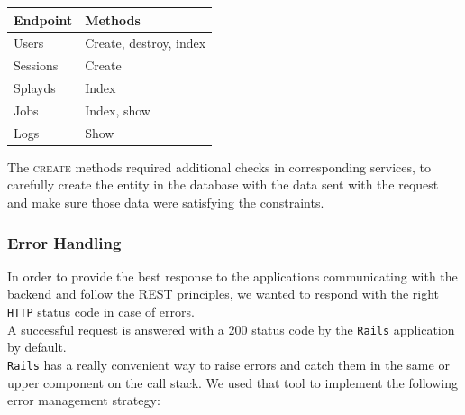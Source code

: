 \documentclass{eplmastersthesis}
\begin{document}
          \begin{table}[H]
            \centering
            \begin{tabular}{|l|l|}
            \hline
            \textbf{Endpoint} & \textbf{Methods}       \\ \hline
            Users             & Create, destroy, index \\
            Sessions          & Create                 \\
            Splayds           & Index                  \\
            Jobs              & Index, show            \\
            Logs              & Show                   \\ \hline
            \end{tabular}
          \end{table}

          The \textsc{create} methods required additional checks in corresponding
          services, to carefully create the entity in the database with
          the data sent with the request and make sure those data were
          satisfying the constraints.\\

        \subsubsection{Error Handling}

          In order to provide the best response to the applications
          communicating with the backend and follow the REST
          principles, we wanted to respond with the right \texttt{HTTP} status code in
          case of errors.\\

          A successful request is answered with a 200
          status code by the \texttt{Rails} application by default.\\
          \texttt{Rails} has a really convenient way to raise errors and catch them
          in the same or upper component on the call stack. We used that tool
          to implement the following error management strategy:
\end{document}
